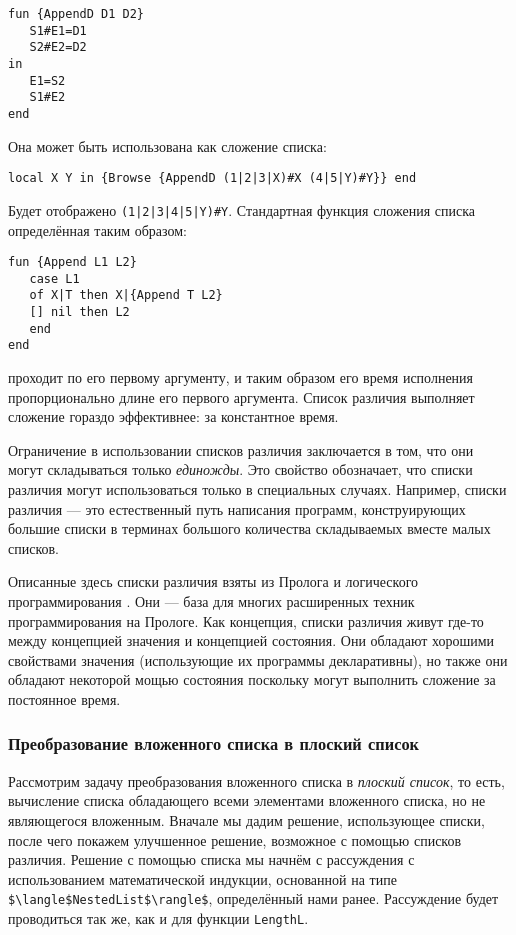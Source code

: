 \begin{lstlisting}
fun {AppendD D1 D2}
   S1#E1=D1
   S2#E2=D2
in
   E1=S2
   S1#E2
end
\end{lstlisting}

Она может быть использована как сложение списка:

\begin{lstlisting}
local X Y in {Browse {AppendD (1|2|3|X)#X (4|5|Y)#Y}} end
\end{lstlisting}

Будет отображено \lstinline!(1|2|3|4|5|Y)#Y!. Стандартная функция сложения списка определённая таким образом:

\begin{lstlisting}
fun {Append L1 L2}
   case L1
   of X|T then X|{Append T L2}
   [] nil then L2
   end
end
\end{lstlisting}

проходит по его первому аргументу, и таким образом его время исполнения пропорционально длине его первого аргумента. Список различия выполняет сложение гораздо эффективнее: за константное время.

Ограничение в использовании списков различия заключается в том, что они могут складываться только \emph{единожды}. Это свойство обозначает, что списки различия могут использоваться только в специальных случаях. Например, списки различия --- это естественный путь написания программ, конструирующих большие списки в терминах большого количества складываемых вместе малых списков.

Описанные здесь списки различия взяты из Пролога и логического программирования \cite{182}. Они --- база для многих расширенных техник программирования на Прологе. Как концепция, списки различия живут где-то между концепцией значения и концепцией состояния. Они обладают хорошими свойствами значения (использующие их программы декларативны), но также они обладают некоторой мощью состояния поскольку могут выполнить сложение за постоянное время.

\subsubsection{Преобразование вложенного списка в плоский список}

Рассмотрим задачу преобразования вложенного списка в \emph{плоский список}, то есть, вычисление списка обладающего всеми элементами вложенного списка, но не являющегося вложенным. Вначале мы дадим решение, использующее списки, после чего покажем улучшенное решение, возможное с помощью списков различия. Решение с помощью списка мы начнём с рассуждения с использованием математической индукции, основанной на типе \lstinline!$\langle$NestedList$\rangle$!, определённый нами ранее. Рассуждение будет проводиться так же, как и для функции \lstinline!LengthL!.

